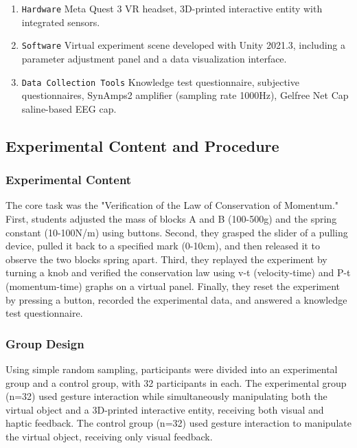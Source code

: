 \documentclass[runningheads]{llncs}
\begin{document}
\begin{enumerate}[label={$\bullet$}]
 \item \texttt{Hardware} Meta Quest 3 VR headset, 3D-printed interactive entity with integrated sensors.
 \item \texttt{Software} Virtual experiment scene developed with Unity 2021.3, including a parameter adjustment panel and a data visualization interface.
 \item \texttt{Data Collection Tools} Knowledge test questionnaire, subjective questionnaires, SynAmps2 amplifier (sampling rate 1000Hz), Gelfree Net Cap saline-based EEG cap.
\end{enumerate}

\subsection{Experimental Content and Procedure}
\subsubsection{Experimental Content}
The core task was the "Verification of the Law of Conservation of Momentum." First, students adjusted the mass of blocks A and B (100-500g) and the spring constant (10-100N/m) using buttons. Second, they grasped the slider of a pulling device, pulled it back to a specified mark (0-10cm), and then released it to observe the two blocks spring apart. Third, they replayed the experiment by turning a knob and verified the conservation law using v-t (velocity-time) and P-t (momentum-time) graphs on a virtual panel. Finally, they reset the experiment by pressing a button, recorded the experimental data, and answered a knowledge test questionnaire.

\subsubsection{Group Design}
Using simple random sampling, participants were divided into an experimental group and a control group, with 32 participants in each. The experimental group (n=32) used gesture interaction while simultaneously manipulating both the virtual object and a 3D-printed interactive entity, receiving both visual and haptic feedback. The control group (n=32) used gesture interaction to manipulate the virtual object, receiving only visual feedback.
\end{document}
